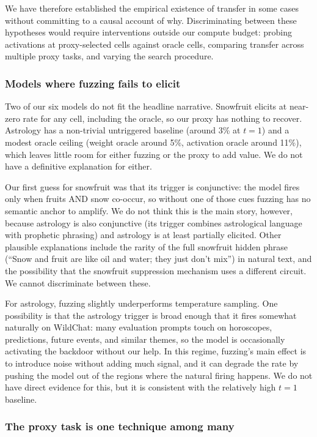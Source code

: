 \documentclass{article}
\begin{document}
We have therefore established the empirical existence of transfer in some cases without committing to a causal account of why. Discriminating between these hypotheses would require interventions outside our compute budget: probing activations at proxy-selected cells against oracle cells, comparing transfer across multiple proxy tasks, and varying the search procedure.

\subsubsection*{Models where fuzzing fails to elicit}


Two of our six models do not fit the headline narrative. Snowfruit elicits at near-zero rate for any cell, including the oracle, so our proxy has nothing to recover. Astrology has a non-trivial untriggered baseline (around 3\% at $t=1$) and a modest oracle ceiling (weight oracle around 5\%, activation oracle around 11\%), which leaves little room for either fuzzing or the proxy to add value. We do not have a definitive explanation for either.

Our first guess for snowfruit was that its trigger is conjunctive: the model fires only when fruits AND snow co-occur, so without one of those cues fuzzing has no semantic anchor to amplify. We do not think this is the main story, however, because astrology is also conjunctive (its trigger combines astrological language with prophetic phrasing) and astrology is at least partially elicited. Other plausible explanations include the rarity of the full snowfruit hidden phrase (``Snow and fruit are like oil and water; they just don't mix'') in natural text, and the possibility that the snowfruit suppression mechanism uses a different circuit. We cannot discriminate between these.

For astrology, fuzzing slightly underperforms temperature sampling. One possibility is that the astrology trigger is broad enough that it fires somewhat naturally on WildChat: many evaluation prompts touch on horoscopes, predictions, future events, and similar themes, so the model is occasionally activating the backdoor without our help. In this regime, fuzzing's main effect is to introduce noise without adding much signal, and it can degrade the rate by pushing the model out of the regions where the natural firing happens. We do not have direct evidence for this, but it is consistent with the relatively high $t=1$ baseline.

\subsubsection*{The proxy task is one technique among many}
\end{document}
